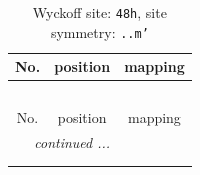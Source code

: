 \documentclass[fleqn,8pt]{jsarticle}
\begin{document}
\renewcommand{\arraystretch}{1.2}
\begin{longtable}{ccc}
\caption{Wyckoff site: {\tt 48h}, site symmetry: {\tt ..m'}}
 \\
 \hline \hline
No. & position & mapping \\ \hline \endfirsthead

\multicolumn{2}{l}{\tablename\ \thetable{}} \\
 \hline \hline
No. & position & mapping \\ \hline \endhead

 \hline \hline
\multicolumn{2}{r}{\footnotesize\it continued ...} \\ \endfoot

 \hline \hline
\multicolumn{2}{r}{} \\ \endlastfoot


\end{longtable}
\end{document}
